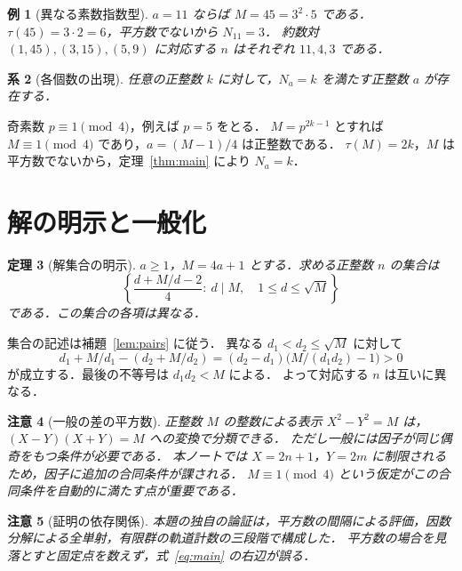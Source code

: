 \documentclass[a5paper,10pt,onecolumn]{jsarticle}
\makeatletter
\theoremstyle{mathnotetheorem}
\newtheorem{theorem}{定理}[section]
\newtheorem{corollary}[theorem]{系}
\newtheorem{example}[theorem]{例}
\newtheorem{remark}[theorem]{注意}
\renewcommand{\proofname}{証明}
\renewenvironment{proof}[1][\proofname]{%
  \par\pushQED{\qed}\normalfont\topsep4\p@\@plus2\p@\relax
  \trivlist\item[\hskip\labelsep\bfseries #1]\ignorespaces
}{\popQED\endtrivlist\@endpefalse}
\makeatother
\begin{document}
\begin{example}[異なる素数指数型]
$a=11$ ならば $M=45=3^2\cdot5$ である．
$\tau(45)=3\cdot2=6$，平方数でないから $N_{11}=3$．
約数対 $(1,45),(3,15),(5,9)$ に対応する $n$ はそれぞれ $11,4,3$ である．
\end{example}

\begin{corollary}[各個数の出現]
任意の正整数 $k$ に対して，$N_a=k$ を満たす正整数 $a$ が存在する．
\end{corollary}
\begin{proof}
奇素数 $p\equiv1\pmod4$，例えば $p=5$ をとる．
$M=p^{2k-1}$ とすれば $M\equiv1\pmod4$ であり，$a=(M-1)/4$ は正整数である．
$\tau(M)=2k$，$M$ は平方数でないから，定理~\ref{thm:main} により $N_a=k$．
\end{proof}

\section{解の明示と一般化}
\begin{theorem}[解集合の明示]
$a\ge1$，$M=4a+1$ とする．求める正整数 $n$ の集合は
\[
 \left\{\frac{d+M/d-2}{4}:\ d\mid M,\quad 1\le d\le\sqrt M\right\}
\]
である．この集合の各項は異なる．
\end{theorem}
\begin{proof}
集合の記述は補題~\ref{lem:pairs} に従う．
異なる $d_1<d_2\le\sqrt M$ に対して
\[
 d_1+M/d_1-(d_2+M/d_2)
 =(d_2-d_1)\bigl(M/(d_1d_2)-1\bigr)>0
\]
が成立する．最後の不等号は $d_1d_2<M$ による．
よって対応する $n$ は互いに異なる．
\end{proof}

\begin{remark}[一般の差の平方数]
正整数 $M$ の整数による表示 $X^2-Y^2=M$ は，$(X-Y)(X+Y)=M$ への変換で分類できる．
ただし一般には因子が同じ偶奇をもつ条件が必要である．
本ノートでは $X=2n+1$，$Y=2m$ に制限されるため，因子に追加の合同条件が課される．
$M\equiv1\pmod4$ という仮定がこの合同条件を自動的に満たす点が重要である．
\end{remark}

\begin{remark}[証明の依存関係]
本題の独自の論証は，平方数の間隔による評価，因数分解による全単射，有限群の軌道計数の三段階で構成した．
平方数の場合を見落とすと固定点を数えず，式~\eqref{eq:main} の右辺が誤る．
\end{remark}
\end{document}
